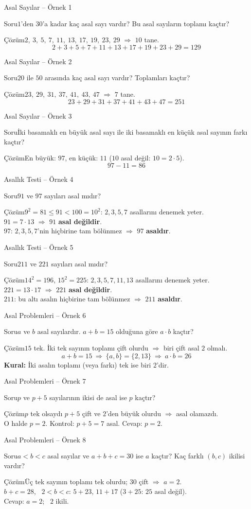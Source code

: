 \documentclass[aspectratio=169,11pt,handout]{beamer}
\newcommand{\soru}[3]{%
\begin{frame}{#1}
  \begin{block}{Soru}\large #2\end{block}
  \pause
  \begin{exampleblock}{Çözüm}\large #3\end{exampleblock}
\end{frame}}
\begin{document}
\soru{Asal Sayılar -- Örnek 1}
{\(1\)'den \(30\)'a kadar kaç asal sayı vardır? Bu asal sayıların toplamı kaçtır?}
{\(2,\ 3,\ 5,\ 7,\ 11,\ 13,\ 17,\ 19,\ 23,\ 29\) \(\Rightarrow\) \(10\) tane.
\[2+3+5+7+11+13+17+19+23+29=129\]}

\soru{Asal Sayılar -- Örnek 2}
{\(20\) ile \(50\) arasında kaç asal sayı vardır? Toplamları kaçtır?}
{\(23,\ 29,\ 31,\ 37,\ 41,\ 43,\ 47\) \(\Rightarrow\) \(7\) tane.
\[23+29+31+37+41+43+47=251\]}

\soru{Asal Sayılar -- Örnek 3}
{İki basamaklı en büyük asal sayı ile iki basamaklı en küçük asal sayının farkı kaçtır?}
{En büyük: \(97\), \quad en küçük: \(11\) \quad (\(10\) asal değil: \(10=2\cdot 5\)).
\[97-11=86\]}

\soru{Asallık Testi -- Örnek 4}
{\(91\) ve \(97\) sayıları asal mıdır?}
{\(9^2=81\le 91<100=10^2\): \(2,3,5,7\) asallarını denemek yeter.\\[3pt]
\(91=7\cdot 13\) \(\Rightarrow\) \(91\) \textbf{asal değildir}.\\[3pt]
\(97\): \(2,3,5,7\)'nin hiçbirine tam bölünmez \(\Rightarrow\) \(97\) \textbf{asaldır}.}

\soru{Asallık Testi -- Örnek 5}
{\(211\) ve \(221\) sayıları asal mıdır?}
{\(14^2=196\), \(15^2=225\): \(2,3,5,7,11,13\) asallarını denemek yeter.\\[3pt]
\(221=13\cdot 17\) \(\Rightarrow\) \(221\) \textbf{asal değildir}.\\[3pt]
\(211\): bu altı asalın hiçbirine tam bölünmez \(\Rightarrow\) \(211\) \textbf{asaldır}.}

\soru{Asal Problemleri -- Örnek 6}
{\(a\) ve \(b\) asal sayılardır. \(a+b=15\) olduğuna göre \(a\cdot b\) kaçtır?}
{\(15\) tek. İki tek sayının toplamı çift olurdu \(\Rightarrow\) biri çift asal \(2\) olmalı.
\[a+b=15\ \Rightarrow\ \{a,b\}=\{2,13\}\ \Rightarrow\ a\cdot b=26\]
\textbf{Kural:} İki asalın toplamı (veya farkı) tek ise biri \(2\)'dir.}

\soru{Asal Problemleri -- Örnek 7}
{\(p\) ve \(p+5\) sayılarının ikisi de asal ise \(p\) kaçtır?}
{\(p\) tek olsaydı \(p+5\) çift ve \(2\)'den büyük olurdu \(\Rightarrow\) asal olamazdı.\\[3pt]
O halde \(p=2\). \quad Kontrol: \(p+5=7\) asal. \quad Cevap: \(p=2\).}

\soru{Asal Problemleri -- Örnek 8}
{\(a<b<c\) asal sayılar ve \(a+b+c=30\) ise \(a\) kaçtır? Kaç farklı \((b,c)\) ikilisi vardır?}
{Üç tek sayının toplamı tek olurdu; \(30\) çift \(\Rightarrow\) \(a=2\).\\[3pt]
\(b+c=28\), \ \(2<b<c\): \quad \(5+23\), \quad \(11+17\) \quad (\(3+25\): \(25\) asal değil).\\[3pt]
Cevap: \(a=2\); \ \(2\) ikili.}
\end{document}
